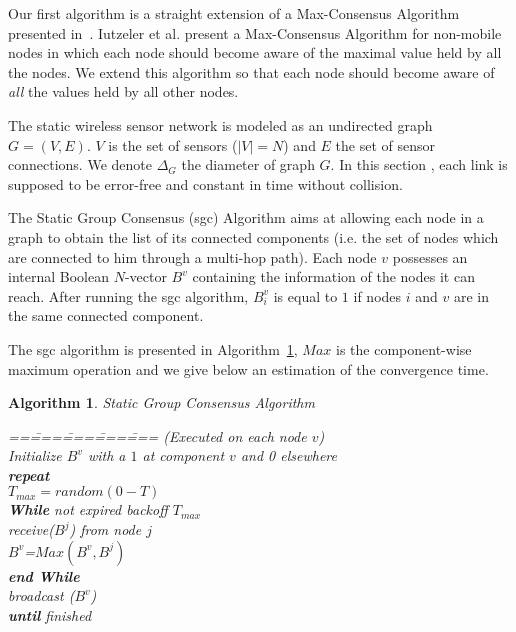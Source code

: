 \documentclass{sig-alternate}
\begin{document}
Our first  algorithm is a straight extension of a Max-Consensus Algorithm presented in~\cite{Iutzeler2012}. Iutzeler et al. present a Max-Consensus Algorithm for non-mobile nodes in which  each node should become aware of the maximal value held by all the nodes. We  extend this algorithm so that each node should become aware of {\em all} the values held by all other nodes. 

The static wireless sensor network is modeled as an undirected graph
$G=(V,E)$.  $V$ is the set of sensors ($|V|=N$)  and $E$ the set of sensor connections.  
We denote $\Delta_G$ the diameter of graph $G$. 
In this section \newcommand{\iid}{i.i.d}, each link is supposed to be error-free and
constant in time without collision.


\newcommand{\sgc}{\sc sgc}

The Static Group Consensus ({\sgc}) Algorithm aims at allowing each
node in a graph to obtain the list of its connected components (i.e. the set of nodes which are connected to
him through a multi-hop path).
Each node $v$ possesses an internal Boolean $N$-vector $B^v$ containing
the information of the nodes it can reach. After running the {\sgc}
algorithm, $B^v_i$ is equal to $1$ if nodes $i$ and $v$ are in the same
connected component.


\newtheorem{algorithm}[equation]{Algorithm}

The {\sgc} algorithm is presented in Algorithm~\ref{algo1}, $Max$ is
the component-wise maximum operation 
and we give below an estimation of the convergence time.


\begin{algorithm}
\label{algo1}
{\sc Static Group Consensus Algorithm }
\begin{tabbing}
==\= ===\= ===\= ===\= ===\kill
(Executed on each node $v$)\+ \\
Initialize $B^v$ with a $1$ at component $v$ and 0 elsewhere\\ 
{\bf repeat}\+\\
$T_{max}=random(0-T)$\\
{\bf While}  not expired backoff $T_{max}$ \+ \\
receive($B^j$) from node $j$\\
$B^v$=$Max(B^v,B^j)$\-\\
{\bf end While}\\
broadcast ($B^v$)\-\\
{\bf until}  finished
\end{tabbing}
\end{algorithm}
\end{document}
